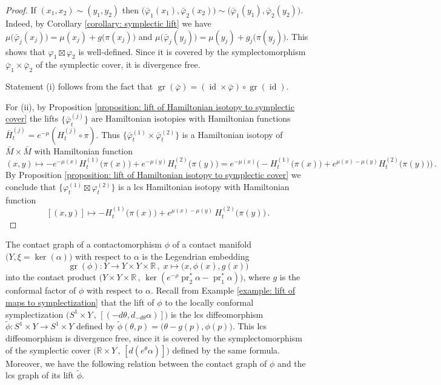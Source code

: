 \documentclass{amsart}
\DeclareMathOperator{\gr}{gr}
\DeclareMathOperator{\pr}{pr}
\DeclareMathOperator{\id}{id}
\theoremstyle{remark}
\begin{document}
\begin{proof}
If $(x_1, x_2) \sim (y_1, y_2)$ then
$\big( \bar{\varphi}_1 (x_1) , \bar{\varphi}_2 (x_2) \big)
\sim \big( \bar{\varphi}_1 (y_1) , \bar{\varphi}_2 (y_2) \big)$. 
Indeed, by Corollary \ref{corollary: symplectic lift}
we have
$\mu \big( \bar{\varphi}_j (x_j) \big) = \mu (x_j) + g \big( \pi (x_j) \big)$
and $\mu \big( \bar{\varphi}_j (y_j) \big) = \mu (y_j) + g_j \big( \pi (y_j) \big)$.
This shows that $\varphi_1 \boxtimes \varphi_2$
is well-defined.
Since it is covered by the symplectomorphism
$\bar{\varphi}_1 \times \bar{\varphi}_2$ of the symplectic cover,
it is divergence free.

Statement (i) follows from the fact that
$\gr (\bar{\varphi}) = (\id \times \bar{\varphi}) \circ \gr (\id)$.

For (ii),
by Proposition \ref{proposition: lift of Hamiltonian isotopy to symplectic cover}
the lifts $\{\bar{\varphi}_t^{(j)}\}$ are Hamiltonian isotopies
with Hamiltonian functions
$\bar{H}_t^{(j)} = e^{-\mu} (H_t^{(j)} \circ \pi)$.
Thus $\{ \bar{\varphi}_t^{(1)} \times \bar{\varphi}_t^{(2)} \}$
is a Hamiltonian isotopy of $\bar{M} \times \bar{M}$
with Hamiltonian function
\[
(x, y) \mapsto
- e^{-\mu(x)} H_t^{(1)} \big(\pi(x)\big) + e^{-\mu(y)} H_t^{(2)} \big(\pi(y)\big)
= e^{-\mu(x)} \Big( - H_t^{(1)} \big(\pi(x)\big)
+ e^{\mu(x) - \mu(y)} H_t^{(2)} \big(\pi(y)\big) \Big) \,.
\]
By Proposition \ref{proposition: lift of Hamiltonian isotopy to symplectic cover}
we conclude that $\big\{ \varphi_t^{(1)} \boxtimes \varphi_t^{(2)} \big\}$
is a lcs Hamiltonian isotopy with Hamiltonian function
\[
[(x, y)] \mapsto
- H_t^{(1)} \big(\pi(x)\big) + e^{\mu(x) - \mu (y)} \, H_t^{(2)} \big(\pi(y)\big) \,.
\]
\end{proof}

The contact graph of a contactomorphism $\phi$
of a contact manifold $\big( Y , \xi = \ker (\alpha) \big)$
with respect to $\alpha$
is the Legendrian embedding
\[
\gr (\phi): Y \rightarrow Y \times Y \times \mathbb{R} \,,\;
x \mapsto \big( x, \phi(x), g(x) \big)
\]
into the contact product
$\big(Y \times Y \times \mathbb{R} \,,\,
\ker (e^{-\rho} \pr_2^{\ast}\alpha - \pr_1^{\ast}\alpha)\big)$,
where $g$ is the conformal factor of $\phi$
with respect to $\alpha$.
Recall from Example \ref{example: lift of maps to symplectization}
that the lift of $\phi$ to the locally conformal symplectization
$\big( S^1 \times Y \,,\, [(-d\theta, d_{-d\theta} \alpha)] \big)$
is the lcs diffeomorphism
$\widetilde{\phi}: S^1 \times Y \rightarrow S^1 \times Y$
defined by
$\widetilde{\phi} (\theta, p) = \big( \theta - g(p) , \phi(p) \big)$.
This lcs diffeomorphism is divergence free,
since it is covered by the symplectomorphism
of the symplectic cover
$\big(\mathbb{R} \times Y \,,\, [d(e^{\theta}\alpha)]\big)$
defined by the same formula.
Moreover,
we have the following relation
between the contact graph of $\phi$
and the lcs graph of its lift $\widetilde{\phi}$.
\end{document}

